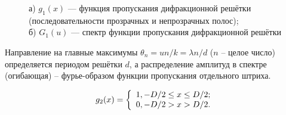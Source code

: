 \documentclass[a5paper,10pt, twoside]{article} %
\begin{document}
		\begin{figure}[h]
			\begin{minipage}[h]{0.49\linewidth}
			\end{minipage}
			\hfill
			\begin{minipage}[h]{0.49\linewidth}
			\end{minipage}
			\caption
			{
				а) $g_1 (x)$ — функция пропускания дифракционной решётки (последовательности 
				               прозрачных и непрозрачных полос); \\
				б) $G_1 (u)$ — спектр функции пропускания дифракционной решётки
			}
			\label{ris:dr}
		\end{figure}
		
		Направление на главные максимумы $\theta_n = un / k = \lambda n / d$ ($n$ -- целое число) 
		определяется периодом решётки $d$, а распределение амплитуд в спектре (огибающая) -- 
		фурье-образом функции пропускания отдельного штриха.
		
		\begin{equation}
			g_2(x) = 
			\left\lbrace\begin{array}{c} 
				1, -D / 2 \le x \le D / 2; \\ 
				0, -D / 2 > x > D / 2.
			 \end{array} \right.
		\end{equation}
		
\end{document}
